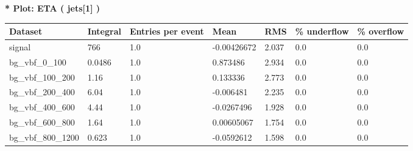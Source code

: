 \documentclass[a4paper, 10pt]{article}
\begin{document}
\textbf{* Plot: ETA ( jets[1] ) }\\
   \begin{table}[H]
  \begin{center}
    \begin{tabular}{|m{23.0mm}|m{23.0mm}|m{18.0mm}|m{19.0mm}|m{19.0mm}|m{19.0mm}|m{19.0mm}|}
      \hline
      {\cellcolor{yellow}         Dataset}& {\cellcolor{yellow}         Integral}& {\cellcolor{yellow}         Entries per event}& {\cellcolor{yellow}         Mean}& {\cellcolor{yellow}         RMS}& {\cellcolor{yellow}         \% underflow}& {\cellcolor{yellow}         \% overflow}\\
      \hline
      {\cellcolor{white}         signal}& {\cellcolor{white}         766}& {\cellcolor{white}         1.0}& {\cellcolor{white}         -0.00426672}& {\cellcolor{white}         2.037}& {\cellcolor{green}         0.0}& {\cellcolor{green}         0.0}\\
      \hline
      {\cellcolor{white}         bg\_vbf\_0\_100}& {\cellcolor{white}         0.0486}& {\cellcolor{white}         1.0}& {\cellcolor{white}         0.873486}& {\cellcolor{white}         2.934}& {\cellcolor{green}         0.0}& {\cellcolor{green}         0.0}\\
      \hline
      {\cellcolor{white}         bg\_vbf\_100\_200}& {\cellcolor{white}         1.16}& {\cellcolor{white}         1.0}& {\cellcolor{white}         0.133336}& {\cellcolor{white}         2.773}& {\cellcolor{green}         0.0}& {\cellcolor{green}         0.0}\\
      \hline
      {\cellcolor{white}         bg\_vbf\_200\_400}& {\cellcolor{white}         6.04}& {\cellcolor{white}         1.0}& {\cellcolor{white}         -0.006481}& {\cellcolor{white}         2.235}& {\cellcolor{green}         0.0}& {\cellcolor{green}         0.0}\\
      \hline
      {\cellcolor{white}         bg\_vbf\_400\_600}& {\cellcolor{white}         4.44}& {\cellcolor{white}         1.0}& {\cellcolor{white}         -0.0267496}& {\cellcolor{white}         1.928}& {\cellcolor{green}         0.0}& {\cellcolor{green}         0.0}\\
      \hline
      {\cellcolor{white}         bg\_vbf\_600\_800}& {\cellcolor{white}         1.64}& {\cellcolor{white}         1.0}& {\cellcolor{white}         0.00605067}& {\cellcolor{white}         1.754}& {\cellcolor{green}         0.0}& {\cellcolor{green}         0.0}\\
      \hline
      {\cellcolor{white}         bg\_vbf\_800\_1200}& {\cellcolor{white}         0.623}& {\cellcolor{white}         1.0}& {\cellcolor{white}         -0.0592612}& {\cellcolor{white}         1.598}& {\cellcolor{green}         0.0}& {\cellcolor{green}         0.0}\\

\end{tabular}
\end{center}
\end{table}
\end{document}
